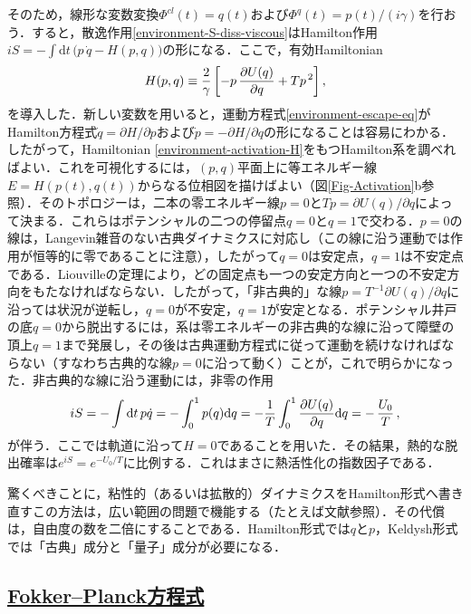 \documentclass[a4paper,11pt]{ltjsarticle}
\newcommand{\subsectionlink}[1]{\subsection[#1]{\hyperlink{toc}{#1}}}
\def\d{\mathrm{d}}
\begin{document}
そのため，線形な変数変換$\Phi^{cl}(t)=q(t)$および$\Phi^q(t)=p(t)/(i\gamma)$を行おう．すると，散逸作用\eqref{environment-S-diss-viscous}はHamilton作用$iS=-\int\d t\,\big(p\,\dot{q} - H(p,q)
\big)$の形になる．ここで，有効Hamiltonian
\begin{equation}\label{environment-activation-H}
H(p,q)\equiv {2\over \gamma}\left[ -p\, {\partial U(q)\over
\partial q} + Tp^{\,2} \right] ,
\end{equation}を導入した．新しい変数を用いると，運動方程式\eqref{environment-escape-eq}がHamilton方程式$\dot q=\partial H/\partial
p$および$\dot p=-\partial H/\partial q$の形になることは容易にわかる．したがって，Hamiltonian \eqref{environment-activation-H}をもつHamilton系を調べればよい．これを可視化するには，$(p,q)$平面上に等エネルギー線$E=H(p(t),q(t))$からなる位相図を描けばよい（図\ref{Fig-Activation}b参照）．そのトポロジーは，二本の零エネルギー線$p=0$と$Tp=\partial U(q)/\partial q$によって決まる．これらはポテンシャルの二つの停留点$q=0$と$q=1$で交わる．$p=0$の線は，Langevin雑音のない古典ダイナミクスに対応し（この線に沿う運動では作用が恒等的に零であることに注意），したがって$q=0$は安定点，$q=1$は不安定点である．Liouvilleの定理により，どの固定点も一つの安定方向と一つの不安定方向をもたなければならない．したがって，「非古典的」な線$p=T^{-1}\partial U(q)/\partial q$に沿っては状況が逆転し，$q=0$が不安定，$q=1$が安定となる．ポテンシャル井戸の底$q=0$から脱出するには，系は零エネルギーの非古典的な線に沿って障壁の頂上$q=1$まで発展し，その後は古典運動方程式に従って運動を続けなければならない（すなわち古典的な線$p=0$に沿って動く）ことが，これで明らかになった．非古典的な線に沿う運動には，非零の作用
$$ iS=
-\int\d t\, p\dot q=-\int_0^1 p(q)\d q=-{1\over T}\int_0^1 {\partial
U(q)\over \partial q}\d q = -\,{U_0\over T}\,,$$
が伴う．ここでは軌道に沿って$H=0$であることを用いた．その結果，熱的な脱出確率は$e^{iS}=e^{-U_0/T}$に比例する．これはまさに熱活性化の指数因子である．


驚くべきことに，粘性的（あるいは拡散的）ダイナミクスをHamilton形式へ書き直すこの方法は，広い範囲の問題で機能する（たとえば文献\cite{Elgart}参照）．その代償は，自由度の数を二倍にすることである．Hamilton形式では$q$と$p$，Keldysh形式では「古典」成分と「量子」成分が必要になる．


\subsectionlink{Fokker--Planck方程式}\label{sec_environment-6}
\end{document}
